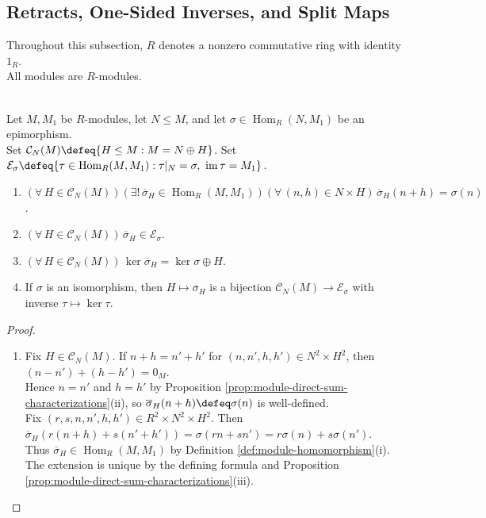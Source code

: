 \subsection{Retracts, One-Sided Inverses, and Split Maps}

Throughout this subsection, $R$ denotes a nonzero commutative ring with identity $1_R$.\\
All modules are $R$-modules.

\begin{theorem} \label{thm:direct-summands-extend-epimorphisms} \\
Let $M,M_1$ be $R$-modules, let $N\leq M$, and let $\sigma\in\operatorname{Hom}_R(N,M_1)$ be an epimorphism.\\
Set $\mathcal{C}_N(M)\defeq\{H\leq M:M=N\oplus H\}$. Set $\mathcal{E}_{\sigma}\defeq\{\tau\in\operatorname{Hom}_R(M,M_1):\tau|_N=\sigma,\ \operatorname{im}\tau=M_1\}$.
\begin{enumerate}[label=(\roman*)]
\setlength{\itemsep}{0pt}
\item $(\forall\,H\in\mathcal{C}_N(M))(\exists!\,\overline{\sigma}_H\in\operatorname{Hom}_R(M,M_1))(\forall\,(n,h)\in N\times H)\,\overline{\sigma}_H(n+h)=\sigma(n)$.
\item $(\forall\,H\in\mathcal{C}_N(M))\,\overline{\sigma}_H\in\mathcal{E}_{\sigma}$.
\item $(\forall\,H\in\mathcal{C}_N(M))\,\ker\overline{\sigma}_H=\ker\sigma\oplus H$.
\item If $\sigma$ is an isomorphism, then $H\mapsto\overline{\sigma}_H$ is a bijection $\mathcal{C}_N(M)\to\mathcal{E}_{\sigma}$ with inverse $\tau\mapsto\ker\tau$.
\end{enumerate}
\begin{proof}
\begin{enumerate}[label=(\roman*)]
\setlength{\itemsep}{0pt}
\item Fix $H\in\mathcal{C}_N(M)$. If $n+h=n'+h'$ for $(n,n',h,h')\in N^2\times H^2$, then $(n-n')+(h-h')=0_M$.\\
Hence $n=n'$ and $h=h'$ by Proposition \ref{prop:module-direct-sum-characterizations}(ii), so $\overline{\sigma}_H(n+h)\defeq\sigma(n)$ is well-defined.\\
Fix $(r,s,n,n',h,h')\in R^2\times N^2\times H^2$. Then $\overline{\sigma}_H(r(n+h)+s(n'+h'))=\sigma(rn+sn')=r\sigma(n)+s\sigma(n')$.\\
Thus $\overline{\sigma}_H\in\operatorname{Hom}_R(M,M_1)$ by Definition \ref{def:module-homomorphism}(i). The extension is unique by the defining formula and Proposition \ref{prop:module-direct-sum-characterizations}(iii).

\end{enumerate}
\end{proof}
\end{theorem}
